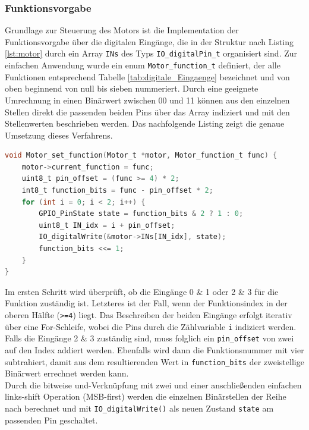 \subsubsection{Funktionsvorgabe}
Grundlage zur Steuerung des Motors ist die Implementation der Funktionsvorgabe über die digitalen Eingänge, die in der Struktur nach Listing \ref{lst:motor} durch ein Array \verb|INs| des Typs \verb|IO_digitalPin_t| organisiert sind. Zur einfachen Anwendung wurde ein enum \verb|Motor_function_t| definiert, der alle Funktionen entsprechend Tabelle \ref{tab:digitale_Eingaenge} bezeichnet und von oben beginnend von null bis sieben nummeriert. Durch eine geeignete Umrechnung in einen Binärwert zwischen 00 und 11 können aus den einzelnen Stellen direkt die passenden beiden Pins über das Array indiziert und mit den Stellenwerten beschrieben werden. Das nachfolgende Listing zeigt die genaue Umsetzung dieses Verfahrens.
\begin{lstlisting}[language=C, caption={Einstellung der Motorfunktionen}, label={lst:motorFunction}]
void Motor_set_function(Motor_t *motor, Motor_function_t func) {
	motor->current_function = func;
	uint8_t pin_offset = (func >= 4) * 2;
	int8_t function_bits = func - pin_offset * 2;
	for (int i = 0; i < 2; i++) {
		GPIO_PinState state = function_bits & 2 ? 1 : 0;
		uint8_t IN_idx = i + pin_offset;
		IO_digitalWrite(&motor->INs[IN_idx], state);
		function_bits <<= 1;
	}
}
\end{lstlisting}
Im ersten Schritt wird überprüft, ob die Eingänge 0 \& 1 oder 2 \& 3 für die Funktion zuständig ist. Letzteres ist der Fall, wenn der Funktionsindex in der oberen Hälfte (\verb|>=4|) liegt. Das Beschreiben der beiden Eingänge erfolgt iterativ über eine For-Schleife, wobei die Pins durch die Zählvariable \verb|i| indiziert werden. Falls die Eingänge 2 \& 3 zuständig sind, muss folglich ein \verb|pin_offset| von zwei auf den Index addiert werden. Ebenfalls wird dann die Funktionsnummer mit vier subtrahiert, damit aus dem resultierenden Wert in \verb|function_bits| der zweistellige Binärwert errechnet werden kann. \\
Durch die bitweise und-Verknüpfung mit zwei und einer anschließenden einfachen links-shift Operation (\acs{MSB}-first) werden die einzelnen Binärstellen der Reihe nach berechnet und mit \verb|IO_digitalWrite()| als neuen Zustand \verb|state| am passenden Pin geschaltet.
